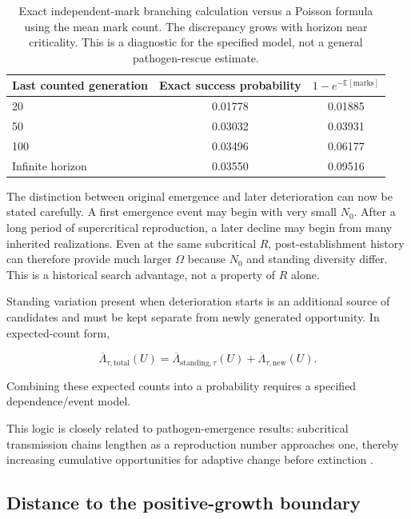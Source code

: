 \documentclass[11pt,a4paper]{article}
\begin{document}
\begin{table}[htbp]
\centering
\begin{tabular}{lcc}
\toprule
Last counted generation & Exact success probability & $1-e^{-\mathbb E[\text{marks}]}$ \\
\midrule
20 & 0.01778 & 0.01885 \\
50 & 0.03032 & 0.03931 \\
100 & 0.03496 & 0.06177 \\
Infinite horizon & 0.03550 & 0.09516 \\
\bottomrule
\end{tabular}
\caption{Exact independent-mark branching calculation versus a Poisson formula using the mean mark count. The discrepancy grows with horizon near criticality. This is a diagnostic for the specified model, not a general pathogen-rescue estimate.}
\label{tab:branching-marks}
\end{table}

The distinction between original emergence and later deterioration can now be stated carefully. A first emergence event may begin with very small $N_0$. After a long period of supercritical reproduction, a later decline may begin from many inherited realizations. Even at the same subcritical $R$, post-establishment history can therefore provide much larger $\Omega$ because $N_0$ and standing diversity differ. This is a historical search advantage, not a property of $R$ alone.

Standing variation present when deterioration starts is an additional source of candidates and must be kept separate from newly generated opportunity. In expected-count form,

\begin{equation}
\overline\Lambda_{\tau,\mathrm{total}}(U)
=
\overline\Lambda_{\mathrm{standing},\tau}(U)
+
\overline\Lambda_{\tau,\mathrm{new}}(U).
\label{eq:standing-plus-new}
\end{equation}

Combining these expected counts into a probability requires a specified dependence/event model.

This logic is closely related to pathogen-emergence results: subcritical transmission chains lengthen as a reproduction number approaches one, thereby increasing cumulative opportunities for adaptive change before extinction \citep{Antia2003,Woolhouse2005}.

\subsection{Distance to the positive-growth boundary}
\end{document}
